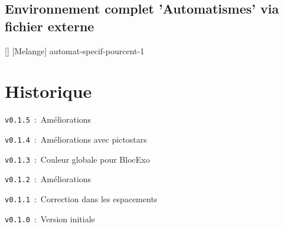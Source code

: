 \documentclass[french,11pt,a4paper]{article}
\def\AutomatEnonce{%
L'opération qui permet de calculer $25\,\%$ de 480 est :
}
\def\AutomatReponses{%
	{$\dfrac{480}{25 \times 100}$} ,
	{$25 \times 480 \times 0,1$} ,
	{$\dfrac{480 \times 100}{25}$} ,
	{$\dfrac{1}{4} \times 480$}
}
\begin{document}
\pagebreak

\subsection{Environnement complet 'Automatismes' via fichier externe}

\begin{codehigh}[language=latex/latex2]
\def\AutomatEnonce{%
  L'opération qui permet de calculer $25\,\%$ de 480 est :
}
\def\AutomatReponses{%
  {$\dfrac{480}{25 \times 100}$} ,
  {$25 \times 480 \times 0,1$} ,
  {$\dfrac{480 \times 100}{25}$} ,
  {$\dfrac{1}{4} \times 480$}
}
\end{codehigh}

\begin{demohigh}[language=latex/latex2]
  []                              %
  [Melange]                       %
  {automat-specif-pourcent-1}     %
\end{demohigh}

\pagebreak

\section{Historique}

\verb|v0.1.5|~:~Améliorations

\verb|v0.1.4|~:~Améliorations avec \textsf{pictostars}

\verb|v0.1.3|~:~Couleur globale pour \textsf{BlocExo}

\verb|v0.1.2|~:~Améliorations

\verb|v0.1.1|~:~Correction dans les espacements

\verb|v0.1.0|~:~Version initiale
\end{document}
